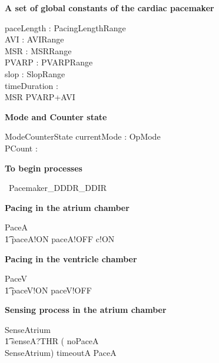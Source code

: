 \hline
\textbf{A set of global constants of the cardiac pacemaker}
\hline
\begin{axdef}
  paceLength : PacingLengthRange\\
  AVI : AVIRange \\
  MSR : MSRRange \\
  PVARP : PVARPRange \\
  slop  : SlopRange  \\
  timeDuration : \nat
  \where \\
  MSR \geq PVARP+AVI
\end{axdef}


\textbf{Mode and Counter state}

\begin{schema}{ModeCounterState}
  currentMode : OpMode\\
  PCount : \nat \\
\end{schema}


\hline
\textbf{To begin \Circus processes }
\hline


\begin{circus}
	\circprocess\ Pacemaker\_DDDR\_DDIR \circdef \circbegin
\end{circus}



\textbf {Pacing in the atrium chamber}

\begin{circusaction}
  PaceA \circdef \\
  \t1 paceA!ON \then paceA!OFF \then  c!ON \then  \Skip 
\end{circusaction}


\textbf {Pacing in the ventricle chamber}

\begin{circusaction}
  PaceV \circdef \\
  \t1 paceV!ON \then paceV!OFF \then \Skip
\end{circusaction}

\textbf {Sensing process in the atrium chamber}



\begin{circusaction}
SenseAtrium \circdef \\ 
\t1 senseA?THR \then 
    ( noPaceA \then \Skip \\
      \extchoice SenseAtrium) \extchoice timeoutA \then  PaceA 
\end{circusaction}




